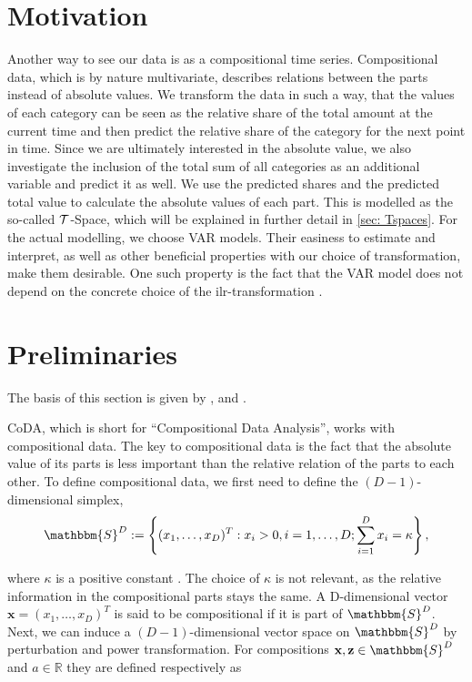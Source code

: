 \section{Motivation}
\label{sec: Coda Motivation}

Another way to see our data is as a compositional time series. Compositional data, which is by nature multivariate, describes relations between the parts instead of absolute values. We transform the data in such a way, that the values of each category can be seen as the relative share of the total amount at the current time and then predict the relative share of the category for the next point in time. Since we are ultimately interested in the absolute value, we also investigate the inclusion of the total sum of all categories as an additional variable and predict it as well. We use the predicted shares and the predicted total value to calculate the absolute values of each part. This is modelled as the so-called $\mathcal{T}$-Space, which will be explained in further detail in \ref{sec: Tspaces}. For the actual modelling, we choose VAR models. Their easiness to estimate and interpret, as well as other beneficial properties with our choice of transformation, make them desirable. One such property is the fact that the VAR model does not depend on the concrete choice of the ilr-transformation \cite{Kynclova:2015}. 


\section{Preliminaries}
\label{sec: Coda Preliminaries}
The basis of this section is given by \cite{Kynclova:2015}, \cite{Egozcue:2003} and \cite{Filzmoser:2020}.

CoDA, which is short for "`Compositional Data Analysis"', works with compositional data. The key to compositional data is the fact that the absolute value of its parts is less important than the relative relation of the parts to each other. To define compositional data, we first need to define the $(D-1)$-dimensional simplex,
	\begin{equation}
	\mathbbm{S}^D := \left\{(x_1,\ldots, x_D)^T: x_i > 0, i =1,\ldots,D; \sum_{i=1}^{D}x_i=\kappa  \right\},
	\label{eq:Simplex Definition}
	\end{equation}
	
where $\kappa$ is a positive constant \cite{Kynclova:2015}. The choice of $\kappa$ is not relevant, as the relative information in the compositional parts stays the same.  A D-dimensional vector $\textbf{x} = (x_1,\ldots,x_D)^T$ is said to be compositional if it is part of $\mathbbm{S}^D$. Next, we can induce a $(D-1)$-dimensional vector space on $\mathbbm{S}^D$ by perturbation and power transformation. For compositions $\textbf{x},\textbf{z} \in \mathbbm{S}^D$ and $a \in \mathbb{R}$ they are defined respectively as \cite{Kynclova:2015}

